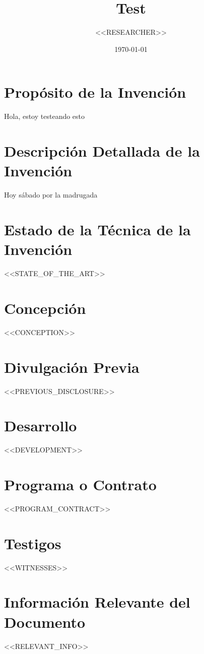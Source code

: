 \documentclass{article}
\title{Test}
\author{<<RESEARCHER>>}
\date{\today}
\begin{document}
\maketitle

\section*{Propósito de la Invención}
Hola, estoy testeando esto

\section*{Descripción Detallada de la Invención}
Hoy sábado por la madrugada

\section*{Estado de la Técnica de la Invención}
<<STATE_OF_THE_ART>>

\section*{Concepción}
<<CONCEPTION>>

\section*{Divulgación Previa}
<<PREVIOUS_DISCLOSURE>>

\section*{Desarrollo}
<<DEVELOPMENT>>

\section*{Programa o Contrato}
<<PROGRAM_CONTRACT>>

\section*{Testigos}
<<WITNESSES>>

\section*{Información Relevante del Documento}
<<RELEVANT_INFO>>
\end{document}
